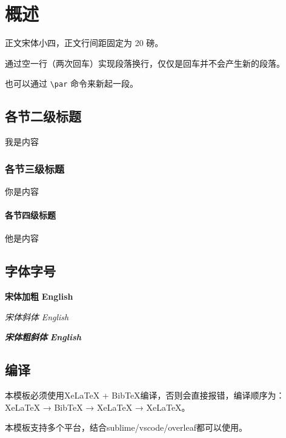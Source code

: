 \section{概述}

正文宋体小四，正文行间距固定为 20 磅。

通过空一行（两次回车）实现段落换行，仅仅是回车并不会产生新的段落。 \par

也可以通过 \verb|\par| 命令来新起一段。

\subsection{各节二级标题}
我是内容

\subsubsection{各节三级标题}
你是内容

\paragraph{各节四级标题}
他是内容

\subsection{字体字号}

{\songti \bfseries 宋体加粗} {\textbf{English}}

{\songti \itshape 宋体斜体} {\textit{English}}

{\songti \bfseries \itshape 宋体粗斜体} {\textbf{\textit{English}}}

\subsection{编译}

本模板必须使用XeLaTeX + BibTeX编译，否则会直接报错，编译顺序为：XeLaTeX → BibTeX → XeLaTeX → XeLaTeX。

本模板支持多个平台，结合sublime/vscode/overleaf都可以使用。